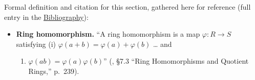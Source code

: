 Formal definition and citation for this section, gathered here for reference (full entry in the \hyperref[sec:root:bibliography:1]{Bibliography}):

\begin{itemize}
\tightlist
\item
  \textbf{Ring homomorphism.} ``A ring homomorphism is a map \(\varphi : R
  \to S\) satisfying (i) \(\varphi(a+b) = \varphi(a)+\varphi(b)\) \ldots{} and

  \begin{enumerate}
  \def\labelenumi{(\roman{enumi})}
  \setcounter{enumi}{1}
  \tightlist
  \item
    \(\varphi(ab) = \varphi(a)\varphi(b)\)'' (\cite{DummitFoote2003}, §7.3 ``Ring Homomorphisms and Quotient Rings,'' p.~239).
  \end{enumerate}
\end{itemize}
